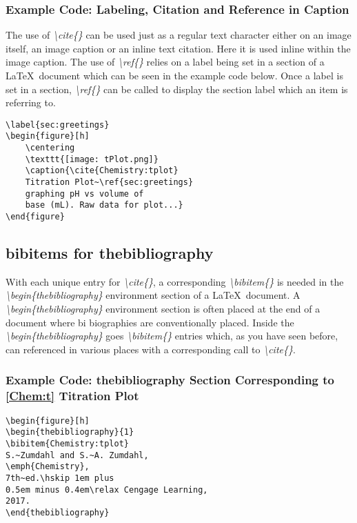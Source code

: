 \documentclass[12pt,journal,compsoc]{IEEEtran}
\begin{document}
\subsubsection*{Example Code: Labeling, Citation and Reference in Caption}
The use of \emph{\textbackslash cite\{\}} can be used just as a regular text character either on an image itself, an image caption or an inline text citation. Here it is used inline within the image caption. The use of \emph{\textbackslash ref\{\}} relies on a label being set in a section of a \LaTeX\ document which can be seen in the example code below. Once a label is set in a section, \emph{\textbackslash ref\{\}} can be called to display the section label which an item is referring to.

{\small
\begin{center}
\begin{verbatim}
\label{sec:greetings}
\begin{figure}[h]
    \centering
    \texttt{[image: tPlot.png]}
    \caption{\cite{Chemistry:tplot} 
    Titration Plot~\ref{sec:greetings} 
    graphing pH vs volume of 
    base (mL). Raw data for plot...}
\end{figure}
\end{verbatim}
\end{center}}

\subsection{bibitems for thebibliography}
With each unique entry for \emph{\textbackslash cite\{\}}, a corresponding \emph{\textbackslash bibitem\{\}} is needed in the \emph{\textbackslash begin\{thebibliography\}} environment section of a \LaTeX\ document. A \emph{\textbackslash begin\{thebibliography\}} environment section is often placed at the end of a document where bi biographies are conventionally placed. Inside the \emph{\textbackslash begin\{thebibliography\}} goes \emph{\textbackslash bibitem\{\}} entries which, as you have seen before, can referenced in various places with a corresponding call to \emph{\textbackslash cite\{\}}.

\subsubsection*{Example Code: thebibliography Section Corresponding to \ref{Chem:t} Titration Plot}
{\small
\begin{center}
\begin{verbatim}
\begin{figure}[h]
\begin{thebibliography}{1}
\bibitem{Chemistry:tplot}
S.~Zumdahl and S.~A. Zumdahl, 
\emph{Chemistry}, 
7th~ed.\hskip 1em plus
0.5em minus 0.4em\relax Cengage Learning, 
2017.
\end{thebibliography}
\end{verbatim}
\end{center}}
\end{document}
